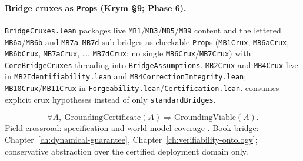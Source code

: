 \paragraph{Bridge cruxes as \texttt{Prop}s (Krym \S9; Phase 6).}
\texttt{BridgeCruxes.lean} packages live \texttt{MB1}/\texttt{MB3}/\texttt{MB5}/\texttt{MB9} content and the lettered \texttt{MB6a}/\texttt{MB6b} and \texttt{MB7a}--\texttt{MB7d} sub-bridges as checkable \texttt{Prop}s (\texttt{MB1Crux}, \texttt{MB6aCrux}, \texttt{MB6bCrux}, \texttt{MB7aCrux}, \ldots, \texttt{MB7dCrux}; no single \texttt{MB6Crux}/\texttt{MB7Crux}) with \texttt{CoreBridgeCruxes} threading into \texttt{BridgeAssumptions}. \texttt{MB2Crux} and \texttt{MB4Crux} live in \texttt{MB2Identifiability.lean} and \texttt{MB4CorrectionIntegrity.lean}; \texttt{MB10Crux}/\texttt{MB11Crux} in \texttt{Forgeability.lean}/\texttt{Certification.lean}.  consumes explicit crux hypotheses instead of only \texttt{standardBridges}.

\begin{assumption}
\label{appi:ass:mb9}
\begin{equation}
\label{appi:eq:mb9}
\forall A,\ \mathrm{GroundingCertificate}(A)\Rightarrow \mathrm{GroundingViable}(A).
\end{equation}
Field crossroad: specification and world-model coverage \autocite{dalrymple2024gsai}.
Book bridge: Chapter~\ref{ch:dynamical-guarantee}, Chapter~\ref{ch:verifiability-ontology}; conservative abstraction over the certified deployment domain only.
\end{assumption}

